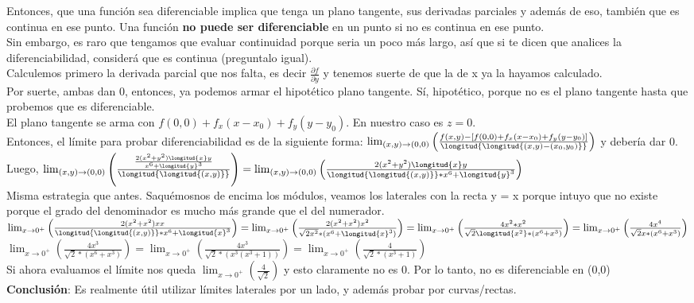 \documentclass[10pt,a4paper]{article}
\begin{document}
Entonces, que una función sea diferenciable implica que tenga un plano tangente, sus derivadas parciales y además de eso, también que es continua en ese punto. Una función \textbf{no puede ser diferenciable} en un punto si no es continua en ese punto. \\
Sin embargo, es raro que tengamos que evaluar continuidad porque seria un poco más largo, así que si te dicen que analices la diferenciabilidad, considerá que es continua (preguntalo igual). \\
Calculemos primero la derivada parcial que nos falta, es decir $\frac{\partial f}{\partial y}$ y tenemos suerte de que la de x ya la hayamos calculado. \\
Por suerte, ambas dan 0, entonces, ya podemos armar el hipotético plano tangente. Sí, hipotético, porque no es el plano tangente hasta que probemos que es diferenciable. \\
El plano tangente se arma con $f(0, 0) + f_{x}(x-x_{0}) + f_{y}(y-y_{0})$. En nuestro caso es $z = 0$. \\
Entonces, el límite para probar diferenciabilidad es de la siguiente forma: $\lim_{(x, y) \to (0,0)} \left(\frac{f(x,y) - [f(0, 0) + f_{x}(x-x_{0}) + f_{y}(y-y_{0})]}{\longitud{\longitud{(x,y) - (x_{0}, y_{0})}}} \right)$ y debería dar 0. \\
Luego, $\lim_{(x, y) \to (0,0)} \left(\frac{\frac{2(x^{2} + y^{2})\longitud{x} y}{x^{6} + \longitud{y}^{3}}}{\longitud{\longitud{(x,y)}}} \right) = \lim_{(x, y) \to (0,0)} \left(\frac{2(x^{2} + y^{2})\longitud{x} y}{\longitud{\longitud{(x,y)}} * x^{6} + \longitud{y}^{3}} \right)$ \\
Misma estrategia que antes. Saquémosnos de encima los módulos, veamos los laterales con la recta y = x porque intuyo que no existe porque el grado del denominador es mucho más grande que el del numerador. \\
$\lim_{x \to 0^{+}} \left(\frac{2(x^{2} + x^{2})x x}{\longitud{\longitud{(x,y)}} * x^{6} + \longitud{x}^{3}} \right) = \lim_{x \to 0^{+}} \left(\frac{2(x^{2} + x^{2})x^{2}}{\sqrt{2x^{2}} * (x^{6} + \longitud{x}^{3})} \right) = \lim_{x \to 0^{+}} \left(\frac{4x^{2} * x^{2}}{\sqrt{2} \longitud{x^{2}} * (x^{6} + x^{3})} \right) = \lim_{x \to 0^{+}} \left(\frac{4x^{4}}{\sqrt{2} x * (x^{6} + x^{3})} \right)    $ \\
$\lim_{x \to 0^{+}} \left(\frac{4x^{3}}{\sqrt{2} * (x^{6} + x^{3})} \right) = \lim_{x \to 0^{+}} \left(\frac{4x^{3}}{\sqrt{2} * (x^{3}(x^{3} + 1))} \right) =  \lim_{x \to 0^{+}} \left(\frac{4}{\sqrt{2} * (x^{3} + 1)} \right) $ \\
Si ahora evaluamos el límite nos queda $\lim_{x \to 0^{+}} \left(\frac{4}{\sqrt{2}} \right)$ y esto claramente no es 0. Por lo tanto, no es diferenciable en (0,0) \\
\textbf{Conclusión}: Es realmente útil utilizar límites laterales por un lado, y además probar por curvas/rectas. 
\end{document}
